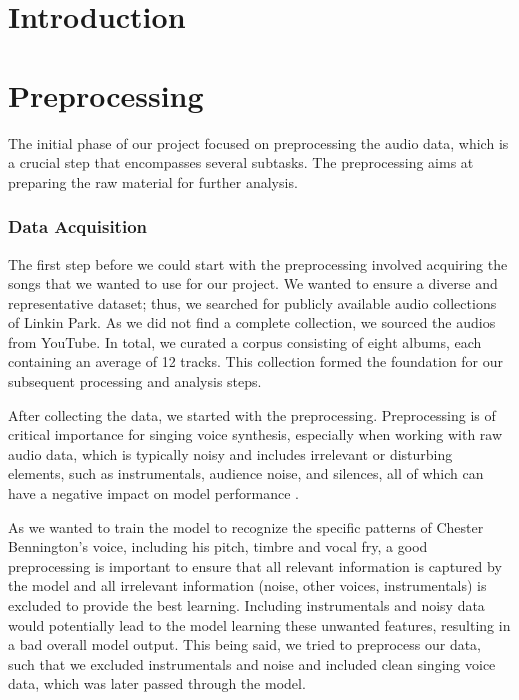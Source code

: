 \documentclass[a4paper]{article}
\subtitle \\
\author{\StudNumeOne}
\begin{document}
\section*{Introduction}


\section*{Preprocessing}


The initial phase of our project focused on preprocessing the audio data, which is a crucial step that encompasses several subtasks. The preprocessing aims at preparing the raw material for further analysis.

\subsubsection*{Data Acquisition}
The first step before we could start with the preprocessing involved acquiring the songs that we wanted to use for our project. We wanted to ensure a diverse and representative dataset; thus, we searched for publicly available audio collections of Linkin Park. As we did not find a complete collection, we sourced the audios from YouTube. In total, we curated a corpus consisting of eight albums, each containing an average of 12 tracks. This collection formed the foundation for our subsequent processing and analysis steps.

After collecting the data, we started with the preprocessing. Preprocessing is of critical importance for singing voice synthesis, especially when working with raw audio data, which is typically noisy and includes irrelevant or disturbing elements, such as instrumentals, audience noise, and silences, all of which can have a negative impact on model performance \cite{Kulkarni2023}.

As we wanted to train the model to recognize the specific patterns of Chester Bennington’s voice, including his pitch, timbre and vocal fry, a good preprocessing is important to ensure that all relevant information is captured by the model and all irrelevant information (noise, other voices, instrumentals) is excluded to provide the best learning. Including instrumentals and noisy data would potentially lead to the model learning these unwanted features, resulting in a bad overall model output. This being said, we tried to preprocess our data, such that we excluded instrumentals and noise and included clean singing voice data, which was later passed through the model.
\end{document}
